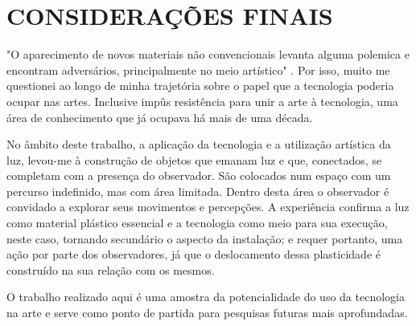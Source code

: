 \chapter{CONSIDERAÇÕES FINAIS}

"O aparecimento de novos materiais não convencionais levanta alguma polemica e encontram adversários, principalmente no meio artístico" \cite{azevedo}. Por isso, muito me questionei ao longo de minha trajetória sobre o papel que a tecnologia poderia ocupar nas artes. Inclusive impûs resistência para unir a arte à tecnologia, uma área de conhecimento que já ocupava há mais de uma década.

No âmbito deste trabalho, a aplicação da tecnologia e a utilização artística da luz, levou-me à construção de objetos que emanam luz e que, conectados, se completam com a presença do observador. São colocados num espaço com um percurso indefinido, mas com área limitada. Dentro desta área o observador é convidado a explorar seus movimentos e percepções. A experiência confirma a luz como material plástico essencial e a tecnologia como meio para sua execução, neste caso, tornando secundário o aspecto da instalação; e requer portanto, uma ação por parte dos observadores, já que o deslocamento dessa plasticidade é construído na sua relação com os mesmos.

O trabalho realizado aqui é uma amostra da potencialidade do uso da tecnologia na arte e serve como ponto de partida para pesquisas futuras mais aprofundadas.

